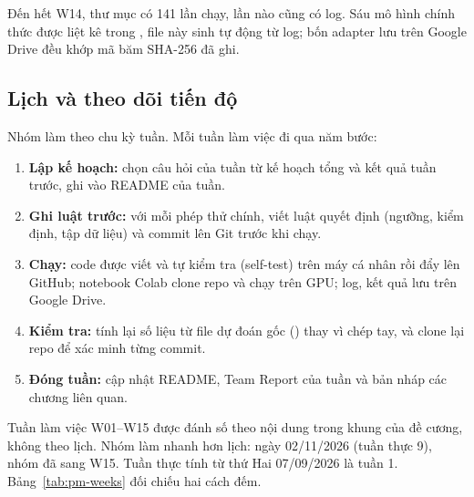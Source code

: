 Đến hết W14, thư mục  có 141 lần chạy, lần nào cũng có log.
Sáu mô hình chính thức được liệt kê trong ,
file này sinh tự động từ log; bốn adapter lưu trên Google Drive đều khớp mã băm
SHA-256 đã ghi.

\subsection{Lịch và theo dõi tiến độ}
\label{sec:pm-process}

Nhóm làm theo chu kỳ tuần. Mỗi tuần làm việc đi qua năm bước:

\begin{enumerate}
  \item \textbf{Lập kế hoạch:} chọn câu hỏi của tuần từ kế hoạch tổng và kết quả
  tuần trước, ghi vào README của tuần.
  \item \textbf{Ghi luật trước:} với mỗi phép thử chính, viết luật quyết định
  (ngưỡng, kiểm định, tập dữ liệu) và commit lên Git trước khi chạy.
  \item \textbf{Chạy:} code được viết và tự kiểm tra (self-test) trên máy cá nhân
  rồi đẩy lên GitHub; notebook Colab clone repo và chạy trên GPU; log, kết quả
  lưu trên Google Drive.
  \item \textbf{Kiểm tra:} tính lại số liệu từ file dự đoán gốc
  () thay vì chép tay, và clone lại repo để xác minh từng
  commit.
  \item \textbf{Đóng tuần:} cập nhật README, Team Report của tuần và bản nháp các
  chương liên quan.
\end{enumerate}

Tuần làm việc W01--W15 được đánh số theo nội dung trong khung của đề cương, không
theo lịch. Nhóm làm nhanh hơn lịch: ngày 02/11/2026 (tuần thực 9), nhóm đã sang
W15. Tuần thực tính từ thứ Hai 07/09/2026 là tuần 1. Bảng~\ref{tab:pm-weeks} đối
chiếu hai cách đếm.

